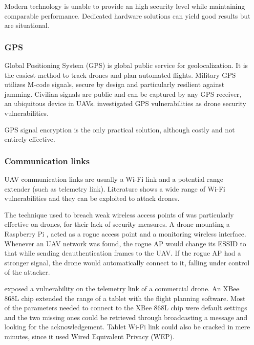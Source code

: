 \documentclass[journal]{IEEEtran}
\begin{document}
Modern technology is unable to provide an high security level while maintaining comparable performance. Dedicated hardware solutions can yield good results but are situational.

\subsubsection{GPS}
Global Positioning System (GPS) is global public service for geolocalization. It is the easiest method to track drones and plan automated flights. Military GPS utilizes M-code signals, secure by design and particularly resilient against jamming. Civilian signals are public and can be captured by any GPS receiver, an ubiquitous device in UAVs. \cite{uavvulnerabilitiesreview} \cite{publicsafetynetworksecurity} \cite{smartcitiesdronesecurity}  \cite{anatomyspoofing} \cite{gpshijackingdetection} \cite{uavexploitation} investigated GPS vulnerabilities as drone security vulnerabilities. 

GPS signal encryption is the only practical solution, although costly and not entirely effective.

\subsubsection{Communication links}
UAV communication links are usually a Wi-Fi link and a potential range extender (such as telemetry link). Literature shows a wide range of Wi-Fi vulnerabilities and they can be exploited to attack drones. 

The technique used to breach weak wireless access points of \cite{accessvulnerabilities} was particularly effective on drones, for their lack of security measures. A drone mounting a Raspberry Pi \cite{raspberrypi}, acted as a rogue access point and a monitoring wireless interface. Whenever an UAV network was found, the rogue AP would change its ESSID to that while sending deauthentication frames to the UAV. If the rogue AP had a stronger signal, the drone would automatically connect to it, falling under control of the attacker.

\cite{exploringuavvulnerabilities} exposed a vulnerability on the telemetry link of a commercial drone. An XBee 868L chip extended the range of a tablet with the flight planning software. Most of the parameters needed to connect to the XBee 868L chip were default settings and the two missing ones could be retrieved through broadcasting a message and looking for the acknowledgement. Tablet Wi-Fi link could also be cracked in mere minutes, since it used Wired Equivalent Privacy (WEP).
\end{document}
